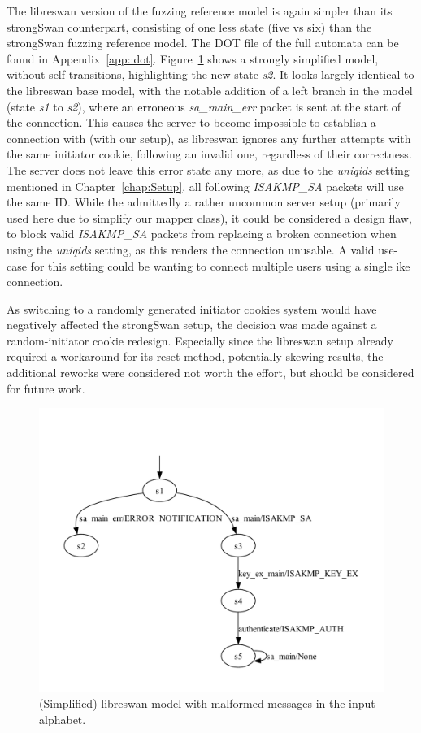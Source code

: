 The libreswan version of the fuzzing reference model is again simpler than its strongSwan counterpart, consisting of one less state (five vs six) than the strongSwan fuzzing reference model. The DOT file of the full automata can be found in Appendix~\ref{app::dot}. Figure~\ref{fig:learnedmodellibrereference} shows a strongly simplified model, without self-transitions, highlighting the new state \emph{s2}. It looks largely identical to the libreswan base model, with the notable addition of a left branch in the model (state \emph{s1} to \emph{s2}), where an erroneous \emph{sa\_main\_err} packet is sent at the start of the connection. This causes the server to become impossible to establish a connection with (with our setup), as libreswan ignores any further attempts with the same initiator cookie, following an invalid one, regardless of their correctness. The server does not leave this error state any more, as due to the \emph{uniqids} setting mentioned in Chapter~\ref{chap:Setup}, all following \emph{ISAKMP\_SA} packets will use the same ID. While the admittedly a rather uncommon server setup (primarily used here due to simplify our mapper class), it could be considered a design flaw, to block valid \emph{ISAKMP\_SA} packets from replacing a broken connection when using the \emph{uniqids} setting, as this renders the connection unusable. A valid use-case for this setting could be wanting to connect multiple users using a single \ac{ike} connection.

As switching to a randomly generated initiator cookies system would have negatively affected the strongSwan setup, the decision was made against a random-initiator cookie redesign. Especially since the libreswan setup already required a workaround for its reset method, potentially skewing results, the additional reworks were considered not worth the effort, but should be considered for future work.

\begin{figure}
	\centering
	\includegraphics[width=0.7\linewidth]{images/models/LearnedModelLibreReference}
	\caption{(Simplified) libreswan model with malformed messages in the input alphabet.}
	\label{fig:learnedmodellibrereference}
\end{figure}

